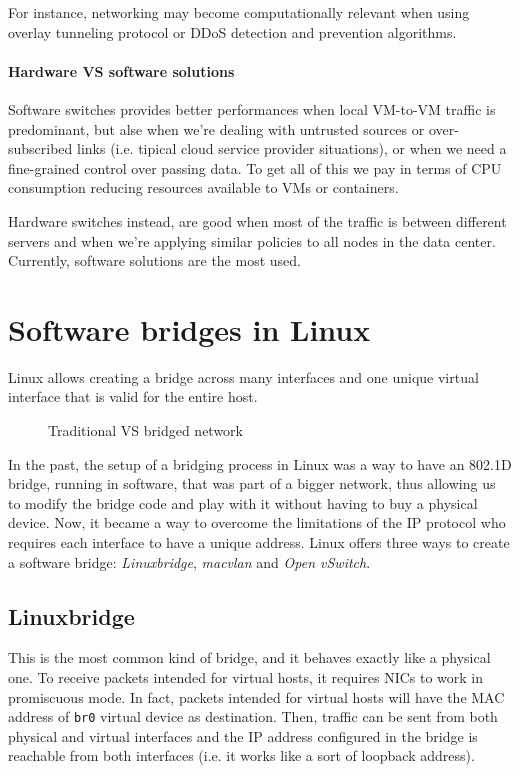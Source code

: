 \begin{note}
    For instance, networking may become computationally relevant when using
    overlay tunneling protocol or DDoS detection and prevention algorithms.
\end{note}

\paragraph{Hardware VS software solutions}
Software switches provides better performances when local VM-to-VM traffic is
predominant, but alse when we're dealing with untrusted sources or over-subscribed
links (i.e. tipical cloud service provider situations), or when we need a
fine-grained control over passing data. To get all of this we pay in terms of
CPU consumption reducing resources available to VMs or containers.

Hardware switches instead, are good when most of the traffic is between different
servers and when we're applying similar policies to all nodes in the data center.
Currently, software solutions are the most used.

\section{Software bridges in Linux}
Linux allows creating a bridge across many interfaces and one unique virtual
interface that is valid for the entire host.

\begin{figure}[h!]
    \centering
    \hspace{1.5cm}
    \caption{Traditional VS bridged network}
\end{figure}

\noindent
In the past, the setup of a bridging process in Linux was a way to have an 802.1D
bridge, running in software, that was part of a bigger network, thus allowing
us to modify the bridge code and play with it without having to buy a physical
device. Now, it became a way to overcome the limitations of the IP protocol who
requires each interface to have a unique address. Linux offers three ways to
create a software bridge: \emph{Linuxbridge}, \emph{macvlan} and \emph{Open
vSwitch}.

\subsection{Linuxbridge}
This is the most common kind of bridge, and it behaves exactly like a physical
one. To receive packets intended for virtual hosts, it requires NICs to work in
promiscuous mode. In fact, packets intended for virtual hosts will have the MAC
address of \texttt{br0} virtual device as destination. Then, traffic can be
sent from both physical and virtual interfaces and the IP address configured in
the bridge is reachable from both interfaces (i.e. it works like a sort of
loopback address).

